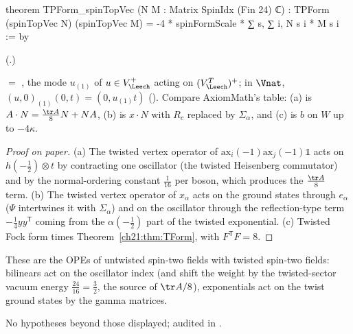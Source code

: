 \begin{leancode}
theorem TPForm_spinTopVec (N M : Matrix SpinIdx (Fin 24) ℂ) :
    TPForm (spinTopVec N) (spinTopVec M)
      = -4 * spinFormScale * ∑ s, ∑ i, N s i * M s i := by
\end{leancode}
(.)
\begin{dictionary}
 $=$ , the mode $u_{(1)}$ of $u\in V_\Leech^+$ acting on
$(V_\Leech^T)^+$; in $\Vnat$, $(u,0)_{(1)}(0,t)=(0,u_{(1)}t)$ ().
Compare AxiomMath's table: (a) is $A\cdot N=\tfrac{\tr A}8N+NA$, (b) is $x\cdot N$ with $R_c$ replaced by
$\Sigma_\alpha$, and (c) is $b$ on $W$ up to $-4\kappa$.
\end{dictionary}
\begin{proof}[Proof on paper]
(a) The twisted vertex operator of $\mathrm{ax}_i(-1)\mathrm{ax}_j(-1)\mathbb1$ acts on
$h(-\tfrac12)\otimes t$ by contracting one oscillator (the twisted Heisenberg commutator) and by the
normal-ordering constant $\tfrac1{16}$ per boson, which produces the $\tfrac{\tr A}8$ term.  (b) The twisted
vertex operator of $x_\alpha$ acts on the ground states through $e_\alpha$ ($\Psi$ intertwines it with $\Sigma_\alpha$)
and on the oscillator through the reflection-type term $-\tfrac14 yy^{\mathsf T}$ coming from the
$\alpha(-\tfrac12)$ part of the twisted exponential.  (c) Twisted Fock form times
Theorem~\ref{ch21:thm:TForm}, with $F^{\mathsf T}F=8$.
\end{proof}
\begin{physics}
These are the OPEs of untwisted spin-two fields with twisted spin-two fields: bilinears act on the
oscillator index (and shift the weight by the twisted-sector vacuum energy $\tfrac{24}{16}=\tfrac32$,
the source of $\tr A/8$), exponentials act on the twist ground states by the gamma matrices.
\end{physics}
\begin{status}
No hypotheses beyond those displayed; audited in .
\end{status}

